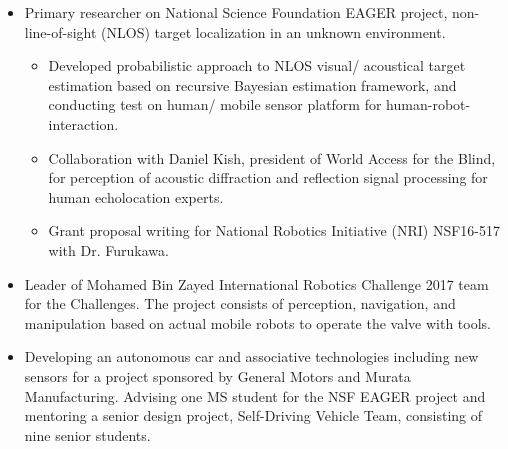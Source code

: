 \documentclass[11pt,letter]{article}
\begin{document}
			\begin{itemize}
				\item Primary researcher on National Science Foundation EAGER project, non-line-of-sight (NLOS) target localization in an unknown environment.
				\begin{itemize}
					\item Developed probabilistic approach to NLOS visual/ acoustical target estimation based on recursive Bayesian estimation framework, and conducting test on human/ mobile sensor platform for human-robot-interaction.
					\item Collaboration with Daniel Kish, president of World Access for the Blind, for perception of acoustic diffraction and reflection signal processing for human echolocation experts.
					\item Grant proposal writing for National Robotics Initiative (NRI) NSF16-517 with Dr. Furukawa.
				\end{itemize}
				\item Leader of Mohamed Bin Zayed International Robotics Challenge 2017 team for the Challenges. The project consists of perception, navigation, and manipulation based on actual mobile robots to operate the valve with tools.
				\item Developing an autonomous car and associative technologies including new sensors for a project sponsored by General Motors and Murata Manufacturing. Advising one MS student for the NSF EAGER project and mentoring a senior design project, Self-Driving Vehicle Team, consisting of nine senior students.
			\end{itemize}
\end{document}

